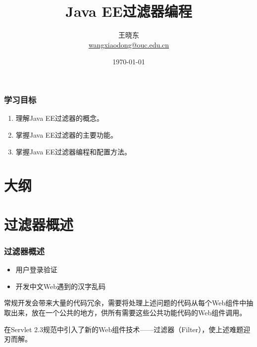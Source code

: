 
\title[KevinW@OUC]{\\  
Java EE过滤器编程}
\author[王晓东]{王晓东\\
  \href{mailto:wangxiaodong@ouc.edu.cn}{\footnotesize wangxiaodong@ouc.edu.cn}}
\date{\today}


 \frame{\titlepage}

\begin{frame}
\frametitle{学习目标}
\begin{enumerate}
\item 理解Java EE过滤器的概念。
\item 掌握Java EE过滤器的主要功能。
\item 掌握Java EE过滤器编程和配置方法。
\end{enumerate}  
\end{frame}

\section*{大纲}

\section{过滤器概述}

\begin{frame}
\frametitle{过滤器概述} 


\begin{itemize}
\item 用户登录验证
\item 开发中文Web遇到的汉字乱码
\end{itemize}

常规开发会带来大量的代码冗余，需要将处理上述问题的代码从每个Web组件中抽取出来，放在一个公共的地方，供所有需要这些公共功能代码的Web组件调用。

在Servlet 2.3规范中引入了新的Web组件技术——{\hei 过滤器（Filter）}，使上述难题迎刃而解。
\end{frame}


